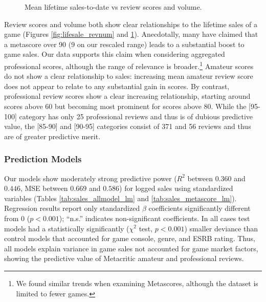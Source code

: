 \documentclass{sig-alternate}
\begin{document}
\begin{figure}[tb]
\begin{subfigure}[b]{\linewidth}
\label{fig:lifesale_revscore}
\end{subfigure}

\caption{Mean lifetime sales-to-date vs review scores and volume.}
\label{fig:lifesale_plots}
\end{figure}


Review scores and volume both show clear relationships to the lifetime sales of a game (Figures \ref{fig:lifesale_revnum} and \ref{fig:lifesale_revscore}). Anecdotally, many have claimed that a metascore over 90 (9 on our rescaled range) leads to a substantial boost to game sales. Our data supports this claim when considering aggregated professional scores, although the range of relevance is broader.\footnote{We found similar trends when examining Metascores, although the dataset is limited to fewer games.} Amateur scores do not show a clear relationship to sales: increasing mean amateur review score does not appear to relate to any substantial gain in scores. By contrast, professional review scores show a clear increasing relationship, starting around scores above 60 but becoming most prominent for scores above 80. While the [95-100] category has only 25 professional reviews and thus is of dubious predictive value, the [85-90] and [90-95] categories consist of 371 and 56 reviews and thus are of greater predictive merit.

\subsubsection{Prediction Models}
Our models show moderately strong predictive power ($R^2$ between $0.360$ and $0.446$, MSE between $0.669$ and $0.586$) for logged sales using standardized variables (Tables \ref{tab:sales_allmodel_lm} and \ref{tab:sales_metascore_lm}). Regression results report only standardized $\beta$ coefficients significantly different from 0 ($p < 0.001$); ``n.s.'' indicates non-significant coefficients. In all cases test models had a statistically significantly ($\chi^2$ test, $p < 0.001$) smaller deviance than control models that accounted for game console, genre, and ESRB rating. Thus, all models explain variance in game sales not accounted for game market factors, showing the predictive value of Metacritic amateur and professional reviews.
\end{document}
